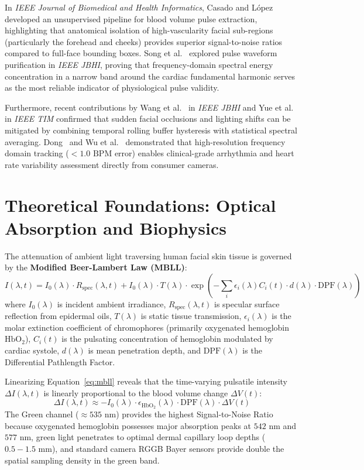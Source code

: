 \documentclass[11pt,a4paper]{report}
\begin{document}
In \emph{IEEE Journal of Biomedical and Health Informatics}, Casado and L{\'o}pez~\cite{casado2023face2ppg} developed an unsupervised pipeline for blood volume pulse extraction, highlighting that anatomical isolation of high-vascularity facial sub-regions (particularly the forehead and cheeks) provides superior signal-to-noise ratios compared to full-face bounding boxes. Song et al.~\cite{song2021pulsegan} explored pulse waveform purification in \emph{IEEE JBHI}, proving that frequency-domain spectral energy concentration in a narrow band around the cardiac fundamental harmonic serves as the most reliable indicator of physiological pulse validity. 

Furthermore, recent contributions by Wang et al.~\cite{wang2024condiff} in \emph{IEEE JBHI} and Yue et al.~\cite{yue2022multimodal} in \emph{IEEE TIM} confirmed that sudden facial occlusions and lighting shifts can be mitigated by combining temporal rolling buffer hysteresis with statistical spectral averaging. Dong~\cite{dong2022self} and Wu et al.~\cite{wu2023atrial} demonstrated that high-resolution frequency domain tracking ($< 1.0\text{ BPM}$ error) enables clinical-grade arrhythmia and heart rate variability assessment directly from consumer cameras.

\section{Theoretical Foundations: Optical Absorption and Biophysics}
The attenuation of ambient light traversing human facial skin tissue is governed by the \textbf{Modified Beer-Lambert Law (MBLL)}:
\begin{equation}
    I(\lambda, t) = I_0(\lambda) \cdot R_{\text{spec}}(\lambda, t) + I_0(\lambda) \cdot T(\lambda) \cdot \exp\left( -\sum_{i} \epsilon_i(\lambda) C_i(t) \cdot d(\lambda) \cdot \text{DPF}(\lambda) \right)
    \label{eq:mbll}
\end{equation}
where $I_0(\lambda)$ is incident ambient irradiance, $R_{\text{spec}}(\lambda, t)$ is specular surface reflection from epidermal oils, $T(\lambda)$ is static tissue transmission, $\epsilon_i(\lambda)$ is the molar extinction coefficient of chromophores (primarily oxygenated hemoglobin $\text{HbO}_2$), $C_i(t)$ is the pulsating concentration of hemoglobin modulated by cardiac systole, $d(\lambda)$ is mean penetration depth, and $\text{DPF}(\lambda)$ is the Differential Pathlength Factor.

Linearizing Equation~\eqref{eq:mbll} reveals that the time-varying pulsatile intensity $\Delta I(\lambda, t)$ is linearly proportional to the blood volume change $\Delta V(t)$:
\begin{equation}
    \Delta I(\lambda, t) \approx - I_0(\lambda) \cdot \epsilon_{\text{HbO}_2}(\lambda) \cdot \text{DPF}(\lambda) \cdot \Delta V(t)
\end{equation}
The Green channel ($\approx 535\text{ nm}$) provides the highest Signal-to-Noise Ratio because oxygenated hemoglobin possesses major absorption peaks at $542\text{ nm}$ and $577\text{ nm}$, green light penetrates to optimal dermal capillary loop depths ($0.5 - 1.5\text{ mm}$), and standard camera RGGB Bayer sensors provide double the spatial sampling density in the green band.
\end{document}
